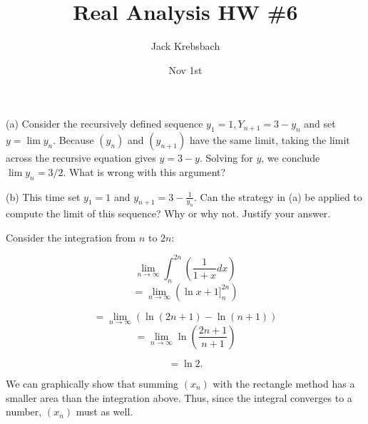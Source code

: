 \documentclass{report}
\title{Real Analysis HW \#6}
\author{Jack Krebsbach }
\date{Nov 1st}
\begin{document}
\maketitle


(a) Consider the recursively defined sequence $y_1=1, Y_{n+1}=3-y_n$ and set $y=\lim y_n$. Because $\left(y_n\right)$ and $\left(y_{n+1}\right)$ have the same limit, taking the limit across the recursive equation gives $y=3-y$. Solving for $y$, we conclude $\lim y_n=3 / 2$. What is wrong with this argument?

(b) This time set $y_1=1$ and $y_{n+1}=3-\frac{1}{y_n}$. Can the strategy in (a) be applied to compute the limit of this sequence? Why or why not. Justify your answer.


\begin{myproof}

Consider the integration from $n$ to $2n$:
 
$$ \lim_{n \rightarrow \infty} \int_{n}^{2n} \left( \frac{1}{1+x} dx  \right)$$
$$= \lim_{n \rightarrow \infty} \left(\ln x+1 ]_{n}^{2n} \right)$$

$$= \lim_{n \rightarrow \infty} \left(\ln (2n+1) - \ln (n+1) \right)$$
$$= \lim_{n \rightarrow \infty} \ln \left(\frac{2n+1}{n+1}\right)$$

$$=  \ln 2.$$

We can graphically show that summing $(x_n)$ with the rectangle method has a smaller area than the integration above. Thus, since the integral converges to a number, $(x_n)$ must as well. 

\end{myproof}


\pagebreak

\end{document}
